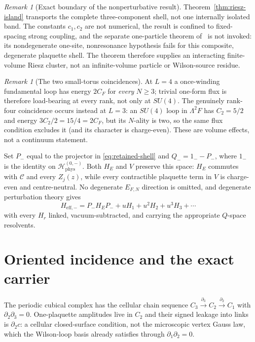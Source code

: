 \documentclass[11pt]{article}
\theoremstyle{plain}
\theoremstyle{definition}
\theoremstyle{remark}
\newtheorem{remark}[theorem]{Remark}
\newcommand{\chk}[1]{}
\newcommand{\CF}{C_F}
\begin{document}
\begin{remark}[Exact boundary of the nonperturbative result]
Theorem~\ref{thm:riesz-island} transports the complete three-component shell,
not one internally isolated band. The constants $c_1,c_2$ are not numerical,
the result is confined to fixed-spacing strong coupling, and the separate
one-particle theorem of~\cite{Yarotsky2004QP} is not invoked: its
nondegenerate one-site, nonresonance hypothesis fails for this composite,
degenerate plaquette shell. The theorem therefore supplies an interacting
finite-volume Riesz cluster, not an infinite-volume particle or Wilson-source
residue.
\end{remark}
\chk{the retained electric shell is exactly the trivial-flux charge-odd plaquette span}
\chk{below 5 C_F/2 the trivial-flux electric spectrum is exactly 0 and 2 C_F}

\begin{remark}[The two small-torus coincidences]
At $L=4$ a once-winding fundamental loop has energy $2\CF$ for
\emph{every} $N\ge3$; trivial one-form flux is therefore load-bearing at
every rank, not only at $SU(4)$. The genuinely rank-four coincidence occurs
instead at $L=3$: an $SU(4)$ loop in $\Lambda^2F$ has
$C_2=5/2$ and energy $3C_2/2=15/4=2\CF$, but its $N$-ality is two, so the
same flux condition excludes it (and its character is charge-even). These
are volume effects, not a continuum statement.
\end{remark}

Set $P_-$ equal to the projector in \eqref{eq:retained-shell} and
$Q_-=1_--P_-$, where $1_-$ is the identity on
$\mathcal H_{\mathrm{phys}}^{(0,-)}$. Both $H_E$ and $V$ preserve this space:
$H_E$ commutes with $\mathcal C$ and every $Z_j(z)$, while every contractible
plaquette term in $V$ is charge-even and centre-neutral. No degenerate
$E_{F,N}$ direction is omitted, and degenerate
perturbation theory gives
\begin{equation}\label{eq:heff}
  H_{\mathrm{eff},-}=P_-H_EP_-+uH_1+u^2H_2+u^3H_3+\cdots
\end{equation}
with every $H_r$ linked, vacuum-subtracted, and carrying the appropriate
$Q$-space resolvents.

\section{Oriented incidence and the exact carrier}
\label{sec:carrier}

The periodic cubical complex has the cellular chain sequence
$C_3\xrightarrow{\partial_3}C_2\xrightarrow{\partial_2}C_1$ with
$\partial_2\partial_3=0$. One-plaquette amplitudes live in $C_2$ and their
signed leakage into links is $\partial_2c$: a cellular closed-surface
condition, not the microscopic vertex Gauss law, which the Wilson-loop basis
already satisfies through $\partial_1\partial_2=0$.
\end{document}
